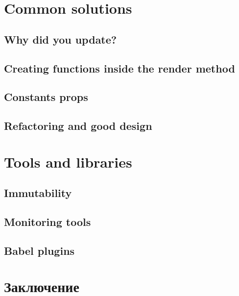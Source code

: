 \section{Common solutions}

\subsection{Why did you update?}

\subsection{Creating functions inside the render method}

\subsection{Constants props}

\subsection{Refactoring and good design}

\section{Tools and libraries}

\subsection{Immutability}

\subsection{Monitoring tools}

\subsection{Babel plugins}

\section{Заключение}
















